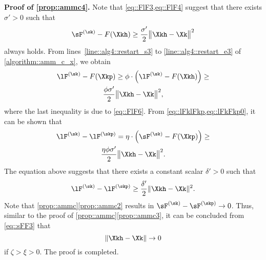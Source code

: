 \vspace{0.8em}
\noindent\textbf{Proof of \ref{prop::ammc4}.\;} Note that \cref{eq::FlF3,eq::FlF4} suggest that there exists $\sigma'>0$ such that
\begin{equation}\label{eq::FlF6}
	\sF^{(\sk)}-F(\Xkh)\geq \frac{\sigma'}{2}\big\|\Xkh-\Xk\big\|^2
\end{equation}
always holds. From lines~\ref{line::alg4::restart_s3} to \ref{line::alg4::restart_e3} of \cref{algorithm::amm_c_x}, we obtain 
\begin{multline}\label{eq::lFkFkp0}
\lF^{(\sk)}-F(\Xkp) \geq \phi\cdot\Big(\lF^{(\sk)} - F(\Xkh)\Big)\geq\\
\frac{\phi\sigma'}{2}\big\|\Xkh-\Xk\big\|^2,
\end{multline}
where the last inequality is due to \cref{eq::FlF6}.
From \cref{eq::lFklFkp,eq::lFkFkp0}, it can be shown that
\begin{multline}\label{eq::FlF5}
\lF^{(\sk)}-\lF^{(\skp)}= \eta\cdot\Big(\sF^{(\sk)}-F(\Xkp)\Big)\geq\\
\frac{\eta\phi\sigma'}{2}\big\|\Xkh-\Xk\big\|^2.
\end{multline} 
The equation above suggests that there exists a constant scalar $\delta'>0$ such that
\begin{equation}\label{eq::sFF3}
\lF^{(\sk)}-\lF^{(\skp)}\geq \frac{\delta'}{2}\|\Xkh-\Xk\|^2.
\end{equation}
Note that \cref{prop::ammc}\ref{prop::ammc2} results in $\sF^{(\sk)} - \sF^{(\skp)}\rightarrow 0$. Thus, similar to the proof of \cref{prop::ammc}\ref{prop::ammc3}, it can be concluded from \cref{eq::sFF3} that
\begin{equation}
	\nonumber
	\|\Xkh-\Xk\| \rightarrow 0
\end{equation}
if $\zeta>\xi>0$. The proof is completed.

